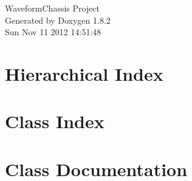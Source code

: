 \documentclass{book}
\begin{document}
\hypersetup{pageanchor=false,citecolor=blue}
\begin{titlepage}
\vspace*{7cm}
\begin{center}
{\Large Waveform\-Chassis Project }\\
\vspace*{1cm}
{\large Generated by Doxygen 1.8.2}\\
\vspace*{0.5cm}
{\small Sun Nov 11 2012 14:51:48}\\
\end{center}
\end{titlepage}
\clearemptydoublepage
{}
\tableofcontents
\clearemptydoublepage
{}
\hypersetup{pageanchor=true,citecolor=blue}
\chapter{Hierarchical Index}

\chapter{Class Index}

\chapter{Class Documentation}














\printindex
\end{document}
